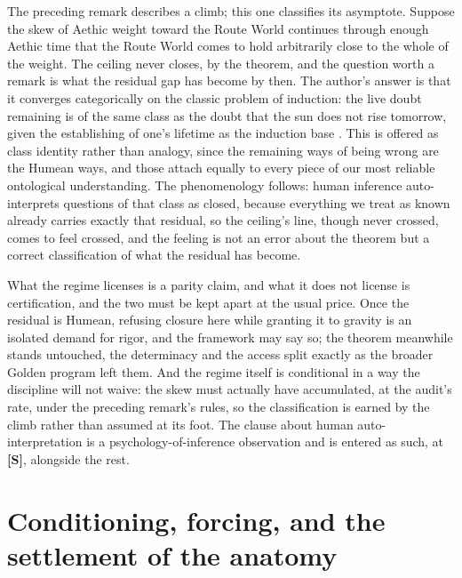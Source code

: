 \begin{remark}\label{sch:rem:inductionregime}
The preceding remark describes a climb; this one classifies its
asymptote. Suppose the skew of Aethic weight toward the Route World
continues through enough Aethic time that the Route World comes to
hold arbitrarily close to the whole of the weight. The ceiling never
closes, by the theorem, and the question worth a remark is what the
residual gap has become by then. The author's answer is that it
converges categorically on the classic problem of induction: the
live doubt remaining is of the same class as the doubt that the sun
does not rise tomorrow, given the establishing of one's lifetime as
the induction base \cite{Hume1748}. This is offered as class
identity rather than analogy, since the remaining ways of being
wrong are the Humean ways, and those attach equally to every piece
of our most reliable ontological understanding. The phenomenology
follows: human inference auto-interprets questions of that class as
closed, because everything we treat as known already carries exactly
that residual, so the ceiling's line, though never crossed, comes to
feel crossed, and the feeling is not an error about the theorem but
a correct classification of what the residual has become.

What the regime licenses is a parity claim, and what it does not
license is certification, and the two must be kept apart at the
usual price. Once the residual is Humean, refusing closure here
while granting it to gravity is an isolated demand for rigor, and
the framework may say so; the theorem meanwhile stands untouched,
the determinacy and the access split exactly as
the broader Golden program left them. And the regime itself is
conditional in a way the discipline will not waive: the skew must
actually have accumulated, at the audit's rate, under the preceding
remark's rules, so the classification is earned by the climb rather
than assumed at its foot. The clause about human auto-interpretation
is a psychology-of-inference observation and is entered as such, at
\textbf{[S]}, alongside the rest.
\end{remark}


\section{Conditioning, forcing, and the settlement of the anatomy}\label{sec:forcing}

